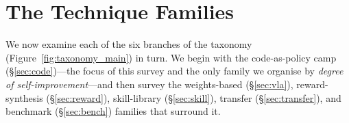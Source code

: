 \section{The Technique Families}
\label{sec:techniques}

We now examine each of the six branches of the taxonomy (Figure~\ref{fig:taxonomy_main}) in
turn. We begin with the code-as-policy camp (\S\ref{sec:code})---the focus of this survey and
the only family we organise by \emph{degree of self-improvement}---and then survey the
weights-based (\S\ref{sec:vla}), reward-synthesis (\S\ref{sec:reward}), skill-library
(\S\ref{sec:skill}), transfer (\S\ref{sec:transfer}), and benchmark (\S\ref{sec:bench})
families that surround it.
